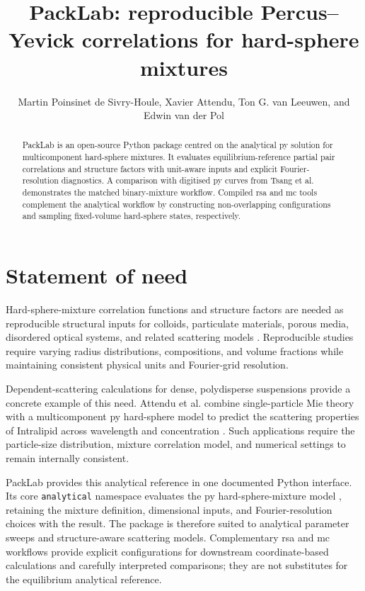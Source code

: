 \documentclass[11pt]{article}
\title{PackLab: reproducible Percus--Yevick correlations for hard-sphere mixtures}
\author{Martin Poinsinet de Sivry-Houle, Xavier Attendu, Ton G. van Leeuwen, and Edwin van der Pol}
\date{}
\begin{document}
\maketitle

\begin{abstract}
PackLab is an open-source Python package centred on the analytical \gls{py} solution for multicomponent hard-sphere mixtures. %
It evaluates equilibrium-reference partial pair correlations and structure factors with unit-aware inputs and explicit Fourier-resolution diagnostics. %
A comparison with digitised \gls{py} curves from Tsang et al. demonstrates the matched binary-mixture workflow. %
Compiled \gls{rsa} and \gls{mc} tools complement the analytical workflow by constructing non-overlapping configurations and sampling fixed-volume hard-sphere states, respectively. %
\end{abstract}

\section{Statement of need}

Hard-sphere-mixture correlation functions and structure factors are needed as reproducible structural inputs for colloids, particulate materials, porous media, disordered optical systems, and related scattering models \cite{HansenMcDonald2013,Torquato2002}. %
Reproducible studies require varying radius distributions, compositions, and volume fractions while maintaining consistent physical units and Fourier-grid resolution. %

Dependent-scattering calculations for dense, polydisperse suspensions provide a concrete example of this need. %
Attendu et al. combine single-particle Mie theory with a multicomponent \gls{py} hard-sphere model to predict the scattering properties of Intralipid across wavelength and concentration \cite{Attendu2026}. %
Such applications require the particle-size distribution, mixture correlation model, and numerical settings to remain internally consistent. %

PackLab provides this analytical reference in one documented Python interface. %
Its core \texttt{analytical} namespace evaluates the \gls{py} hard-sphere-mixture model \cite{Percus1958,Lebowitz1964}, retaining the mixture definition, dimensional inputs, and Fourier-resolution choices with the result. %
The package is therefore suited to analytical parameter sweeps and structure-aware scattering models. %
Complementary \gls{rsa} and \gls{mc} workflows provide explicit configurations for downstream coordinate-based calculations and carefully interpreted comparisons; they are not substitutes for the equilibrium analytical reference. %
\end{document}
